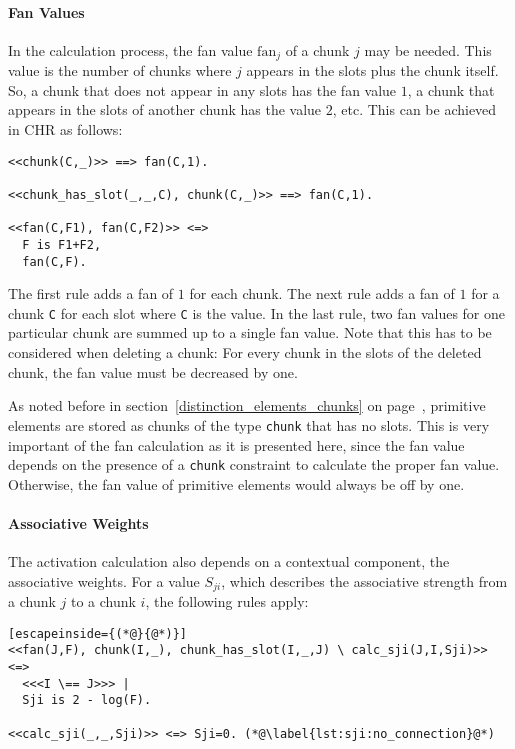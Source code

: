\paragraph{Fan Values}

In the calculation process, the fan value $\mathrm{fan}_j$ of a chunk $j$ may be needed. This value is the number of chunks where $j$ appears in the slots plus the chunk itself. So, a chunk that does not appear in any slots has the fan value $1$, a chunk that appears in the slots of another chunk has the value $2$, etc. This can be achieved in CHR as follows:

\begin{lstlisting}
<<chunk(C,_)>> ==> fan(C,1).

<<chunk_has_slot(_,_,C), chunk(C,_)>> ==> fan(C,1).

<<fan(C,F1), fan(C,F2)>> <=> 
  F is F1+F2, 
  fan(C,F).
\end{lstlisting}

The first rule adds a fan of $1$ for each chunk. The next rule adds a fan of $1$ for a chunk \lstinline|C| for each slot where \lstinline|C| is the value. In the last rule, two fan values for one particular chunk are summed up to a single fan value. Note that this has to be considered when deleting a chunk: For every chunk in the slots of the deleted chunk, the fan value must be decreased by one.

As noted before in section~\ref{distinction_elements_chunks} on page~\pageref{distinction_elements_chunks}, primitive elements are stored as chunks of the type \lstinline|chunk| that has no slots. This is very important of the fan calculation as it is presented here, since the fan value depends on the presence of a \lstinline|chunk| constraint to calculate the proper fan value. Otherwise, the fan value of primitive elements would always be off by one.

\paragraph{Associative Weights}

The activation calculation also depends on a contextual component, the associative weights. For a value $S_{ji}$, which describes the associative strength from a chunk $j$ to a chunk $i$, the following rules apply:

\begin{lstlisting}[escapeinside={(*@}{@*)}]
<<fan(J,F), chunk(I,_), chunk_has_slot(I,_,J) \ calc_sji(J,I,Sji)>> <=> 
  <<<I \== J>>> | 
  Sji is 2 - log(F).

<<calc_sji(_,_,Sji)>> <=> Sji=0. (*@\label{lst:sji:no_connection}@*)
\end{lstlisting}


